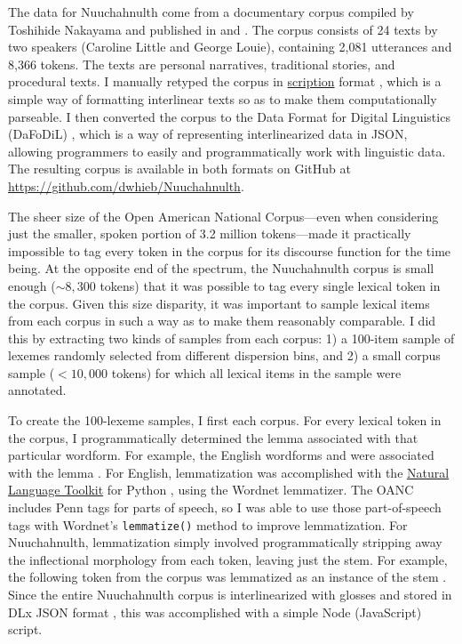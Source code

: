 The data for Nuuchahnulth come from a documentary corpus compiled by Toshihide Nakayama and published in \textcite{Little2003} and \textcite{Louie2003}. The corpus consists of 24 texts by two speakers (Caroline Little and George Louie), containing 2,081 utterances and 8,366 tokens. The texts are personal narratives, traditional stories, and procedural texts. I manually retyped the corpus in \href{https://scription.digitallinguistics.io}{scription} format \parencite{Hieber2021b}, which is a simple way of formatting interlinear texts so as to make them computationally parseable. I then converted the corpus to the Data Format for Digital Linguistics (DaFoDiL) \parencite{Hieber2021a}, which is a way of representing interlinearized data in JSON, allowing programmers to easily and programmatically work with linguistic data. The resulting corpus is available in both formats on GitHub at \url{https://github.com/dwhieb/Nuuchahnulth}.

The sheer size of the Open American National Corpus—even when considering just the smaller, spoken portion of 3.2 million tokens—made it practically impossible to tag every token in the corpus for its discourse function for the time being. At the opposite end of the spectrum, the Nuuchahnulth corpus is small enough ($\sim8,300$ tokens) that it was possible to tag every single lexical token in the corpus. Given this size disparity, it was important to sample lexical items from each corpus in such a way as to make them reasonably comparable. I did this by extracting two kinds of samples from each corpus: 1) a 100-item sample of lexemes randomly selected from different dispersion bins, and 2) a small corpus sample ($<10,000$ tokens) for which all lexical items in the sample were annotated.

To create the 100-lexeme samples, I first  each corpus. For every lexical token in the corpus, I programmatically determined the lemma associated with that particular wordform. For example, the English wordforms  and  were associated with the lemma . For English, lemmatization was accomplished with the \href{http://www.nltk.org/}{Natural Language Toolkit} for Python \parencite{BirdKleinLoper2009}, using the Wordnet lemmatizer. The OANC includes Penn tags for parts of speech, so I was able to use those part-of-speech tags with Wordnet's \texttt{lemmatize()} method to improve lemmatization. For Nuuchahnulth, lemmatization simply involved programmatically stripping away the inflectional morphology from each token, leaving just the stem. For example, the following token from the corpus was lemmatized as an instance of the stem  . Since the entire Nuuchahnulth corpus is interlinearized with glosses and stored in DLx JSON format \parencite{Hieber2021a}, this was accomplished with a simple Node (JavaScript) script.

